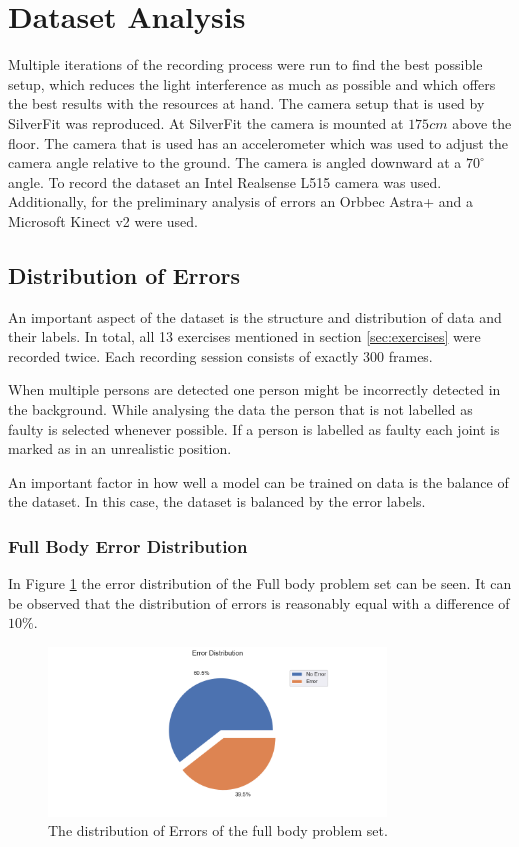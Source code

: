 \section{Dataset Analysis}
\label{sec:dataset}

Multiple iterations of the recording process were run to find the best possible setup, which reduces the light interference as much as possible and which offers the best results with the resources at hand. The camera setup that is used by SilverFit was reproduced. At SilverFit the camera is mounted at $175cm$ above the floor. The camera that is used has an accelerometer which was used to adjust the camera angle relative to the ground. The camera is angled downward at a $70^\circ$ angle. To record the dataset an Intel Realsense L515 camera was used. Additionally, for the preliminary analysis of errors an Orbbec Astra+ and a Microsoft Kinect v2 were used.

\subsection{Distribution of Errors}

An important aspect of the dataset is the structure and distribution of data and their labels. In total, all 13 exercises mentioned in section \ref{sec:exercises} were recorded twice. Each recording session consists of exactly 300 frames.

When multiple persons are detected one person might be incorrectly detected in the background. While analysing the data the person that is not labelled as faulty is selected whenever possible. If a person is labelled as faulty each joint is marked as in an unrealistic position.

An important factor in how well a model can be trained on data is the balance of the dataset. In this case, the dataset is balanced by the error labels. 

\subsubsection{Full Body Error Distribution}

In Figure \ref{fig:fb_pie} the error distribution of the Full body problem set can be seen. It can be observed that the distribution of errors is reasonably equal with a difference of $10\%$. 

\begin{figure}[ht]
  \centering
  \includegraphics[width=0.8\textwidth]{figures/Data/dist_full_body/Error_Distribution_by_Body_Half.png}
  \caption[Error Distribution of the Full Body]{The distribution of Errors of the full body problem set.}
  \label{fig:fb_pie}
\end{figure}

